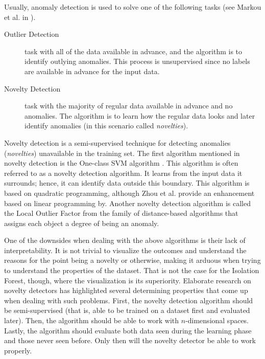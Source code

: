
Usually, anomaly detection is used to solve one of the following tasks (see Markou et al. in \cite{MARKOU20032481}).
\begin{description}
    \item[Outlier Detection]  task with all of the data available in advance, and the algorithm is to identify outlying anomalies. This process is unsupervised since no labels are available in advance for the input data.
    \item[Novelty Detection]  task with the majority of regular data available in advance and no anomalies. The algorithm is to learn how the regular data looks and later identify anomalies (in this scenario called \emph{novelties}).
\end{description}

Novelty detection is a semi-supervised technique for detecting anomalies (\emph{novelties}) unavailable in the training set.
The first algorithm mentioned in novelty detection is the One-class SVM algorithm \cite{tax2004support}. This algorithm is often referred to as a novelty detection algorithm. It learns from the input data it surrounds; hence, it can identify data outside this boundary.
This algorithm is based on quadratic programming, although Zhou et al. \cite{ZHOU20022927} provide an enhancement based on linear programming by.
Another novelty detection algorithm is called the Local Outlier Factor from the family of distance-based algorithms \cite{breunig2000lof} that assigns each object a degree of being an anomaly.



One of the downsides when dealing with the above algorithms is their lack of interpretability. It is not trivial to visualize the outcomes and understand the reasons for the point being a novelty or otherwise, making it arduous when trying to understand the properties of the dataset. That is not the case for the Isolation Forest, though, where the visualization is its superiority.
Elaborate research on novelty detectors has highlighted several determining properties that come up when dealing with such problems. First, the novelty detection algorithm should be semi-supervised (that is, able to be trained on a dataset first and evaluated later). Then, the algorithm should be able to work with \(n\)-dimensional spaces. Lastly, the algorithm should evaluate both data seen during the learning phase and those never seen before. Only then will the novelty detector be able to work properly.

